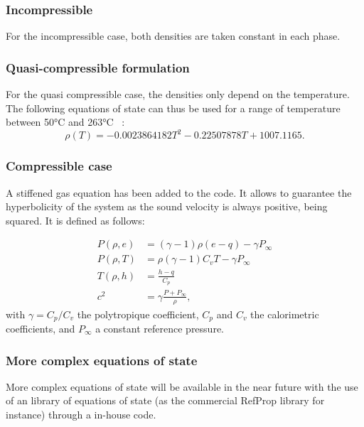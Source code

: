 \subsubsection{Incompressible}

For the incompressible case, both densities are taken constant in each
phase.

\subsubsection{Quasi-compressible formulation}
For the quasi compressible case, the densities only depend on the
temperature. The following equations of state can thus be used for a
range of temperature between 50°C and 263°C~\cite{Rodio2019} :
\begin{equation}
\rho(T)=-0.0023864182 T^2-0.22507878 T + 1007.1165.
\label{loi_qc}
\end{equation}

\subsubsection{Compressible case}
A stiffened gas equation has been added to the code. It allows to
guarantee the hyperbolicity of the system as the sound velocity is
always positive, being squared. It is defined as follows:

\begin{align}
P(\rho ,e)&=(\gamma-1)\rho(e-q)-\gamma P_{\infty}\\
P(\rho ,T)&=\rho (\gamma-1)C_vT-\gamma P_{\infty}\\
T(\rho ,h)&=\frac{h-q}{C_p}\\
c^2&=\gamma\frac{P+P_{\infty}}{\rho},
\end{align}
with $\gamma=C_p/C_v$ the polytropique coefficient, $C_p$ and $C_v$
the calorimetric coefficients, and $P_{\infty}$ a constant reference pressure.

\subsubsection{More complex equations of state}
\label{sec:more-compl-equat}

More complex equations of state will be available in the near future
with the use of an library of equations of state (as the commercial
RefProp library for instance) through a in-house code.


